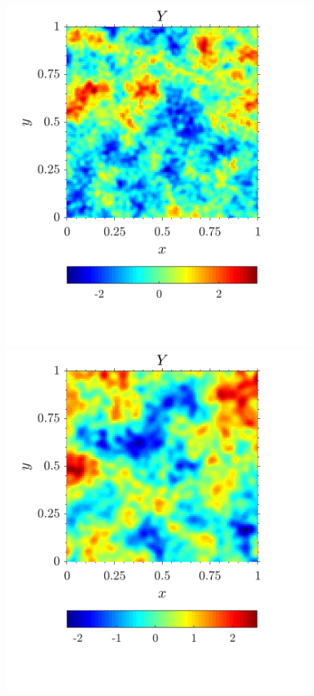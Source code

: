 \begin{figure}[H]
{ \includegraphics[scale=0.5]{figuras/Y_exp_01_E96.png}
 \includegraphics[scale=0.5]{figuras/Y_exp_02_E96.png}}

\end{figure}
